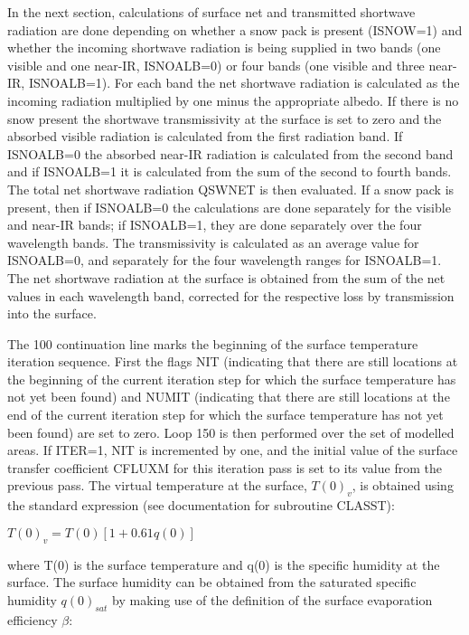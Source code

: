 In the next section, calculations of surface net and transmitted shortwave radiation are done depending on whether a snow pack is present (I\+S\+N\+O\+W=1) and whether the incoming shortwave radiation is being supplied in two bands (one visible and one near-\/\+I\+R, I\+S\+N\+O\+A\+L\+B=0) or four bands (one visible and three near-\/\+I\+R, I\+S\+N\+O\+A\+L\+B=1). For each band the net shortwave radiation is calculated as the incoming radiation multiplied by one minus the appropriate albedo. If there is no snow present the shortwave transmissivity at the surface is set to zero and the absorbed visible radiation is calculated from the first radiation band. If I\+S\+N\+O\+A\+L\+B=0 the absorbed near-\/\+I\+R radiation is calculated from the second band and if I\+S\+N\+O\+A\+L\+B=1 it is calculated from the sum of the second to fourth bands. The total net shortwave radiation Q\+S\+W\+N\+E\+T is then evaluated. If a snow pack is present, then if I\+S\+N\+O\+A\+L\+B=0 the calculations are done separately for the visible and near-\/\+I\+R bands; if I\+S\+N\+O\+A\+L\+B=1, they are done separately over the four wavelength bands. The transmissivity is calculated as an average value for I\+S\+N\+O\+A\+L\+B=0, and separately for the four wavelength ranges for I\+S\+N\+O\+A\+L\+B=1. The net shortwave radiation at the surface is obtained from the sum of the net values in each wavelength band, corrected for the respective loss by transmission into the surface.

The 100 continuation line marks the beginning of the surface temperature iteration sequence. First the flags N\+I\+T (indicating that there are still locations at the beginning of the current iteration step for which the surface temperature has not yet been found) and N\+U\+M\+I\+T (indicating that there are still locations at the end of the current iteration step for which the surface temperature has not yet been found) are set to zero. Loop 150 is then performed over the set of modelled areas. If I\+T\+E\+R=1, N\+I\+T is incremented by one, and the initial value of the surface transfer coefficient C\+F\+L\+U\+X\+M for this iteration pass is set to its value from the previous pass. The virtual temperature at the surface, $T(0)_v$, is obtained using the standard expression (see documentation for subroutine C\+L\+A\+S\+S\+T)\+:

$T(0)_v = T(0) [1 + 0.61 q(0)]$

where T(0) is the surface temperature and q(0) is the specific humidity at the surface. The surface humidity can be obtained from the saturated specific humidity $q(0)_{sat}$ by making use of the definition of the surface evaporation efficiency $\beta$\+:

